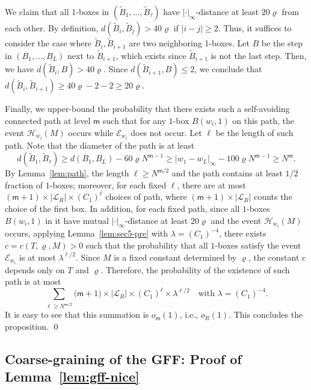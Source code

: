 \documentclass[a4paper]{article}
\numberwithin{equation}{section}
\numberwithin{equation}{section}
\renewcommand{\1}{\mathbf{1}}
\begin{document}
We claim that all 1-boxes in $(\widetilde B_1, \ldots, \widetilde B_\tau)$ have $|\cdot|_\infty$-distance at least $20 \varrho$ from each other. By definition, $d(\widetilde B_i, \widetilde B_j) > 40 \varrho$ if $|i-j| \geq 2$. Thus, it suffices to consider the case where $\widetilde B_i, \widetilde B_{i+1}$ are two neighboring 1-boxes. Let $B$ be the step in $(B_1, \ldots, B_L)$ next to $\widetilde B_{i+1}$, which exists since $\widetilde B_{i+1}$ is not the last step. Then, we have $d(\widetilde B_i, B) > 40 \varrho$. Since $d(\widetilde B_{i+1}, B) \leq 2$, we conclude that $d(\widetilde B_i, \widetilde B_{i+1}) \geq 40 \varrho - 2 - 2 \geq 20 \varrho$.

Finally, we upper-bound the probability that there exists such a self-avoiding connected path at level $\mathsf m$ such that for any $1$-box $B(w_i,1)$ on this path, the event $\mathcal{H}_{w_i}(M)$ occurs while $\mathcal{E}_{w_i}$ does not occur. Let $\ell$ be the length of such path. Note that the diameter of the path is at least
$$
d(\widetilde B_1, \widetilde B_\tau) \geq d(B_1, B_L) - 60 \varrho N^{\mathsf m - 1} \geq |w_1 - w_L|_\infty - 100 \varrho N^{\mathsf m - 1} \geq N^{\mathsf m}.
$$
By Lemma~\ref{lem:path}, the length $\ell \geq N^{\mathsf m / 2}$ and the path contains at least $1/2$ fraction of $1$-boxes; moreover, for each fixed $\ell$, there are at most $(\mathsf m +1) \times |\mathscr{L}_R| \times (C_1)^{\ell}$ choices of path, where $(\mathsf m +1) \times |\mathscr{L}_R|$ counts the choice of the first box. In addition, for each fixed path, since all $1$-boxes $B(w_i,1)$ in it have mutual $|\cdot|_\infty$-distance at least $20 \varrho$ and the event $\mathcal{H}_{w_i}(M)$ occurs, applying Lemma~\ref{lem:sec5-pre} with $\lambda = (C_1)^{-4}$, there exists $c= c(T, \varrho, M)>0$ such that the probability that all $1$-boxes satisfy the event $\mathcal{E}_{w_i}$ is at most $\lambda^{\ell/2}$. Since $M$ is a fixed constant determined by $\varrho$, the constant $c$ depends only on $T$ and $\varrho$. Therefore, the probability of the existence of such path is at most
$$
\sum_{\ell \geq N^{\mathsf m/2}} \mathsf (\mathsf m +1) \times |\mathscr{L}_R| \times (C_1)^\ell \times \lambda^{\ell/2} \quad \mbox{with } \lambda = (C_1)^{-4}.
$$
It is easy to see that this summation is $o_{\mathsf m}(1)$, i.e., $o_R(1)$. This concludes the proposition. \qed

\subsection{Coarse-graining of the GFF: Proof of Lemma~\ref{lem:gff-nice}}\label{subsec:coarse}
\end{document}
